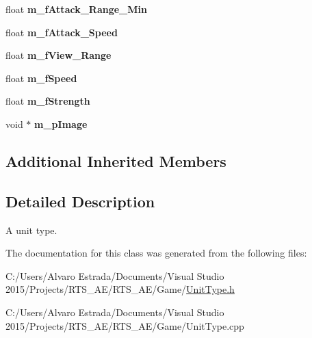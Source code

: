 \begin{DoxyCompactItemize}
\item 
float {\bfseries m\+\_\+f\+Attack\+\_\+\+Range\+\_\+\+Min}\hypertarget{classae_unit_type_af595f0770639337dcd61876c06ac8e89}{}\label{classae_unit_type_af595f0770639337dcd61876c06ac8e89}

\item 
float {\bfseries m\+\_\+f\+Attack\+\_\+\+Speed}\hypertarget{classae_unit_type_a9e415033278b6a6e820b7397b1a2d1f0}{}\label{classae_unit_type_a9e415033278b6a6e820b7397b1a2d1f0}

\item 
float {\bfseries m\+\_\+f\+View\+\_\+\+Range}\hypertarget{classae_unit_type_aaf32bc0f8d0466c77f704f3aafe731f7}{}\label{classae_unit_type_aaf32bc0f8d0466c77f704f3aafe731f7}

\item 
float {\bfseries m\+\_\+f\+Speed}\hypertarget{classae_unit_type_af65cbed874be7bda304c9ab02c41c0bd}{}\label{classae_unit_type_af65cbed874be7bda304c9ab02c41c0bd}

\item 
float {\bfseries m\+\_\+f\+Strength}\hypertarget{classae_unit_type_ac8ea8815e995e9d7eb9ba495b3bc44e2}{}\label{classae_unit_type_ac8ea8815e995e9d7eb9ba495b3bc44e2}

\item 
void $\ast$ {\bfseries m\+\_\+p\+Image}\hypertarget{classae_unit_type_a6f886bb6dc0fc70aeb00c54db295c416}{}\label{classae_unit_type_a6f886bb6dc0fc70aeb00c54db295c416}

\end{DoxyCompactItemize}
\subsection*{Additional Inherited Members}


\subsection{Detailed Description}
A unit type. 

The documentation for this class was generated from the following files\+:\begin{DoxyCompactItemize}
\item 
C\+:/\+Users/\+Alvaro Estrada/\+Documents/\+Visual Studio 2015/\+Projects/\+R\+T\+S\+\_\+\+A\+E/\+R\+T\+S\+\_\+\+A\+E/\+Game/\hyperlink{_unit_type_8h}{Unit\+Type.\+h}\item 
C\+:/\+Users/\+Alvaro Estrada/\+Documents/\+Visual Studio 2015/\+Projects/\+R\+T\+S\+\_\+\+A\+E/\+R\+T\+S\+\_\+\+A\+E/\+Game/Unit\+Type.\+cpp\end{DoxyCompactItemize}
